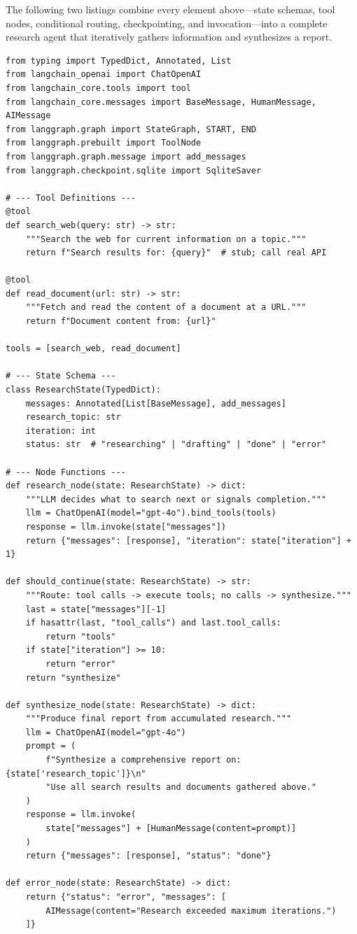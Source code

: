 The following two listings combine every element above---state schemas, tool nodes, conditional routing, checkpointing, and invocation---into a complete research agent that iteratively gathers information and synthesizes a report.

\begin{lstlisting}[style=pythonstyle, caption={Research agent -- state, tools, and node functions}]
from typing import TypedDict, Annotated, List
from langchain_openai import ChatOpenAI
from langchain_core.tools import tool
from langchain_core.messages import BaseMessage, HumanMessage, AIMessage
from langgraph.graph import StateGraph, START, END
from langgraph.prebuilt import ToolNode
from langgraph.graph.message import add_messages
from langgraph.checkpoint.sqlite import SqliteSaver

# --- Tool Definitions ---
@tool
def search_web(query: str) -> str:
    """Search the web for current information on a topic."""
    return f"Search results for: {query}"  # stub; call real API

@tool
def read_document(url: str) -> str:
    """Fetch and read the content of a document at a URL."""
    return f"Document content from: {url}"

tools = [search_web, read_document]

# --- State Schema ---
class ResearchState(TypedDict):
    messages: Annotated[List[BaseMessage], add_messages]
    research_topic: str
    iteration: int
    status: str  # "researching" | "drafting" | "done" | "error"

# --- Node Functions ---
def research_node(state: ResearchState) -> dict:
    """LLM decides what to search next or signals completion."""
    llm = ChatOpenAI(model="gpt-4o").bind_tools(tools)
    response = llm.invoke(state["messages"])
    return {"messages": [response], "iteration": state["iteration"] + 1}

def should_continue(state: ResearchState) -> str:
    """Route: tool calls -> execute tools; no calls -> synthesize."""
    last = state["messages"][-1]
    if hasattr(last, "tool_calls") and last.tool_calls:
        return "tools"
    if state["iteration"] >= 10:
        return "error"
    return "synthesize"

def synthesize_node(state: ResearchState) -> dict:
    """Produce final report from accumulated research."""
    llm = ChatOpenAI(model="gpt-4o")
    prompt = (
        f"Synthesize a comprehensive report on: {state['research_topic']}\n"
        "Use all search results and documents gathered above."
    )
    response = llm.invoke(
        state["messages"] + [HumanMessage(content=prompt)]
    )
    return {"messages": [response], "status": "done"}

def error_node(state: ResearchState) -> dict:
    return {"status": "error", "messages": [
        AIMessage(content="Research exceeded maximum iterations.")
    ]}
\end{lstlisting}


